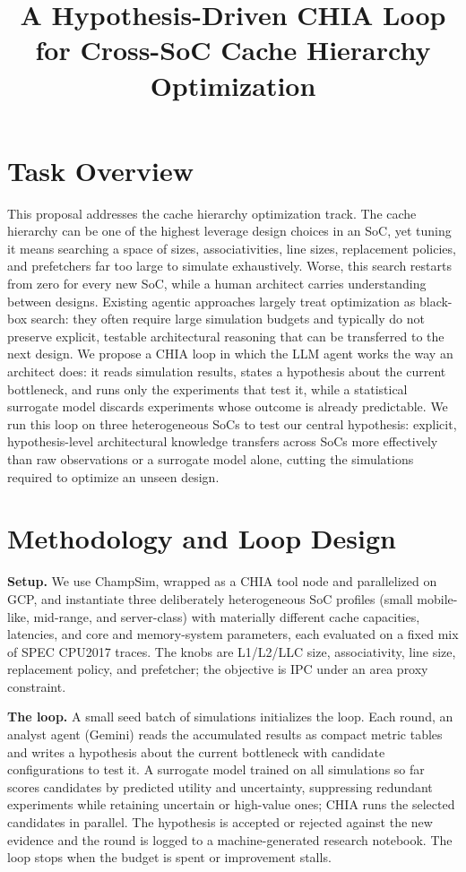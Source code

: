 \documentclass[10pt]{article}
\title{\vspace{-2cm}A Hypothesis-Driven CHIA Loop for Cross-SoC Cache Hierarchy Optimization}
\date{\vspace{-0.5cm}}
\begin{document}
\maketitle
\vspace{-1cm}

\section{Task Overview}
This proposal addresses the cache hierarchy optimization track. The cache hierarchy can be one of the highest leverage design choices in an SoC, yet tuning it means searching a space of sizes, associativities, line sizes, replacement policies, and prefetchers far too large to simulate exhaustively. Worse, this search restarts from zero for every new SoC, while a human architect carries understanding between designs. Existing agentic approaches largely treat optimization as black-box search: they often require large simulation budgets and typically do not preserve explicit, testable architectural reasoning that can be transferred to the next design. We propose a CHIA loop in which the LLM agent works the way an architect does: it reads simulation results, states a hypothesis about the current bottleneck, and runs only the experiments that test it, while a statistical surrogate model discards experiments whose outcome is already predictable. We run this loop on three heterogeneous SoCs to test our central hypothesis: explicit, hypothesis-level architectural knowledge transfers across SoCs more effectively than raw observations or a surrogate model alone, cutting the simulations required to optimize an unseen design.

\section{Methodology and Loop Design}
\textbf{Setup.} We use ChampSim, wrapped as a CHIA tool node and parallelized on GCP, and instantiate three deliberately heterogeneous SoC profiles (small mobile-like, mid-range, and server-class) with materially different cache capacities, latencies, and core and memory-system parameters, each evaluated on a fixed mix of SPEC CPU2017 traces. The knobs are L1/L2/LLC size, associativity, line size, replacement policy, and prefetcher; the objective is IPC under an area proxy constraint.

\textbf{The loop.} A small seed batch of simulations initializes the loop. Each round, an analyst agent (Gemini) reads the accumulated results as compact metric tables and writes a hypothesis about the current bottleneck with candidate configurations to test it. A surrogate model trained on all simulations so far scores candidates by predicted utility and uncertainty, suppressing redundant experiments while retaining uncertain or high-value ones; CHIA runs the selected candidates in parallel. The hypothesis is accepted or rejected against the new evidence and the round is logged to a machine-generated research notebook. The loop stops when the budget is spent or improvement stalls.
\end{document}
